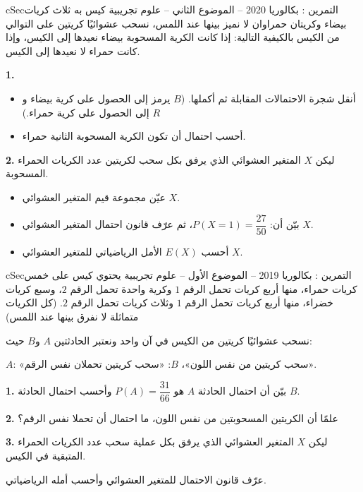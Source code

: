 \documentclass[12pt,a4paper]{article}
\newenvironment{BOX}[2]{\begin{otherlanguage}{english}\begin{arbox}{#1}{#2}}{\end{arbox}\end{otherlanguage}}
\newcounter{exo}
\newenvironment{tamrin}[1]{\stepcounter{exo}\begin{BOX}{cSec}{التمرين \theexo: #1}}{\end{BOX}}
\newenvironment{LTR}{\begin{otherlanguage}{english}}{\end{otherlanguage}}
\renewcommand{\ldots}{\mathinner{\ldotp\ldotp\ldotp}}
\newenvironment{sq}{\begin{itemize}[leftmargin=2.4em,itemsep=3pt]}{\end{itemize}}
\newcommand{\qa}{\item[(أ)]}\newcommand{\qb}{\item[(ب)]}\newcommand{\qc}{\item[(جـ)]}\newcommand{\qd}{\item[(د)]}\newcommand{\qe}{\item[(هـ)]}
\newcommand{\QQ}[1]{\par\smallskip\textbf{#1.} }
\begin{document}
\begin{tamrin}{بكالوريا 2020 -- الموضوع الثاني -- علوم تجريبية}
كيس به ثلاث كريات بيضاء وكريتان حمراوان لا نميز بينها عند اللمس، نسحب عشوائيًا كريتين على التوالي من الكيس بالكيفية التالية: إذا كانت الكرية المسحوبة بيضاء نعيدها إلى الكيس، وإذا كانت حمراء لا نعيدها إلى الكيس.
\begin{center}\begin{LTR}\end{LTR}\end{center}
\QQ{1}
\begin{sq}
\qa أنقل شجرة الاحتمالات المقابلة ثم أكملها. ($B$ يرمز إلى الحصول على كرية بيضاء و$R$ إلى الحصول على كرية حمراء.)
\qb أحسب احتمال أن تكون الكرية المسحوبة الثانية حمراء.
\end{sq}
\QQ{2} ليكن $X$ المتغير العشوائي الذي يرفق بكل سحب لكريتين عدد الكريات الحمراء المسحوبة.
\begin{sq}
\qa عيّن مجموعة قيم المتغير العشوائي $X$.
\qb بيّن أن: $P(X=1)=\dfrac{27}{50}$، ثم عرّف قانون احتمال المتغير العشوائي $X$.
\qc أحسب $E(X)$ الأمل الرياضياتي للمتغير العشوائي $X$.
\end{sq}
\end{tamrin}

\begin{tamrin}{بكالوريا 2019 -- الموضوع الأول -- علوم تجريبية}
يحتوي كيس على خمس كريات حمراء، منها أربع كريات تحمل الرقم $1$ وكرية واحدة تحمل الرقم $2$، وسبع كريات خضراء، منها أربع كريات تحمل الرقم $1$ وثلاث كريات تحمل الرقم $2$. (كل الكريات متماثلة لا نفرق بينها عند اللمس)

نسحب عشوائيًا كريتين من الكيس في آن واحد ونعتبر الحادثتين $A$ و$B$ حيث:

$A$: «سحب كريتين من نفس اللون»، \quad $B$: «سحب كريتين تحملان نفس الرقم».
\QQ{1} بيّن أن احتمال الحادثة $A$ هو $P(A)=\dfrac{31}{66}$ وأحسب احتمال الحادثة $B$.
\QQ{2} علمًا أن الكريتين المسحوبتين من نفس اللون، ما احتمال أن تحملا نفس الرقم؟
\QQ{3} ليكن $X$ المتغير العشوائي الذي يرفق بكل عملية سحب عدد الكريات الحمراء المتبقية في الكيس.

عرّف قانون الاحتمال للمتغير العشوائي وأحسب أمله الرياضياتي.
\end{tamrin}
\end{document}

